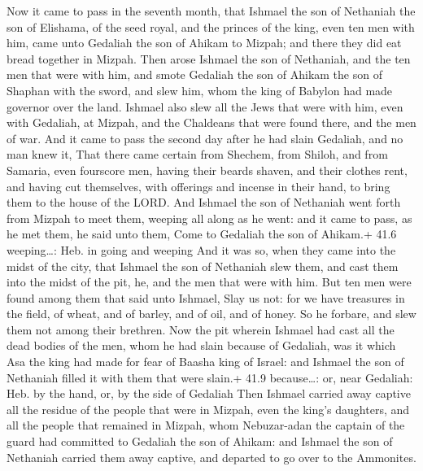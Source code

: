  Now it came to pass in the seventh month, that Ishmael the
son of Nethaniah the son of Elishama, of the seed royal, and the princes
of the king, even ten men with him, came unto Gedaliah the son of Ahikam
to Mizpah; and there they did eat bread together in Mizpah. 
Then arose Ishmael the son of Nethaniah, and the ten men that were with
him, and smote Gedaliah the son of Ahikam the son of Shaphan with the
sword, and slew him, whom the king of Babylon had made governor over the
land.  Ishmael also slew all the Jews that were with him,
even with Gedaliah, at Mizpah, and the Chaldeans that were found there,
and the men of war.  And it came to pass the second day
after he had slain Gedaliah, and no man knew it,  That there
came certain from Shechem, from Shiloh, and from Samaria, even fourscore
men, having their beards shaven, and their clothes rent, and having cut
themselves, with offerings and incense in their hand, to bring them to
the house of the LORD.  And Ishmael the son of Nethaniah
went forth from Mizpah to meet them, weeping all along as he went: and
it came to pass, as he met them, he said unto them, Come to Gedaliah the
son of Ahikam.+ 41.6 weeping\ldots: Heb. in going and weeping
 And it was so, when they came into the midst of the city,
that Ishmael the son of Nethaniah slew them, and cast them into the
midst of the pit, he, and the men that were with him.  But
ten men were found among them that said unto Ishmael, Slay us not: for
we have treasures in the field, of wheat, and of barley, and of oil, and
of honey. So he forbare, and slew them not among their brethren.
 Now the pit wherein Ishmael had cast all the dead bodies of
the men, whom he had slain because of Gedaliah, was it which Asa the
king had made for fear of Baasha king of Israel: and Ishmael the son of
Nethaniah filled it with them that were slain.+ 41.9 because\ldots: or,
near Gedaliah: Heb. by the hand, or, by the side of Gedaliah
 Then Ishmael carried away captive all the residue of the
people that were in Mizpah, even the king's daughters, and all the
people that remained in Mizpah, whom Nebuzar-adan the captain of the
guard had committed to Gedaliah the son of Ahikam: and Ishmael the son
of Nethaniah carried them away captive, and departed to go over to the
Ammonites.

